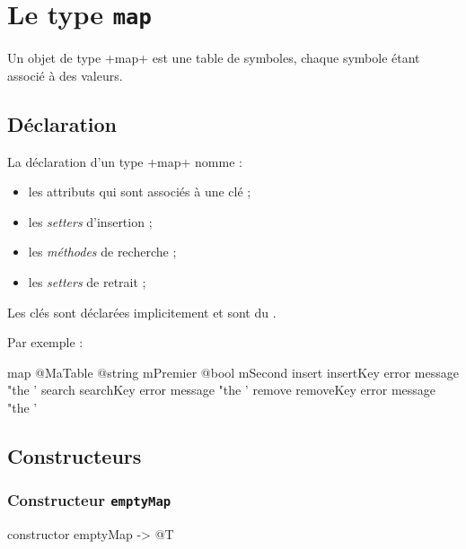 
\chapter{Le type \texttt{map}}

Un objet de type \ggs+map+ est une table de symboles, chaque symbole étant associé à des valeurs.

\section{Déclaration}

La déclaration d'un type \ggs+map+ nomme :
\begin{itemize}
  \item les attributs qui sont associés à une clé ;
  \item les \emph{setters} d'insertion ;
  \item les \emph{méthodes} de recherche ;
  \item les \emph{setters} de retrait ;
\end{itemize}

Les clés sont déclarées implicitement et sont du .

Par exemple :

\begin{galgascode}
map @MaTable {
  @string mPremier
  @bool mSecond
  insert insertKey error message "the '%
  search searchKey error message "the '%
  remove removeKey error message "the '%
}
\end{galgascode}







\section{Constructeurs}

\subsection{Constructeur \texttt{emptyMap}}

\begin{galgascode}
constructor emptyMap -> @T
\end{galgascode}

